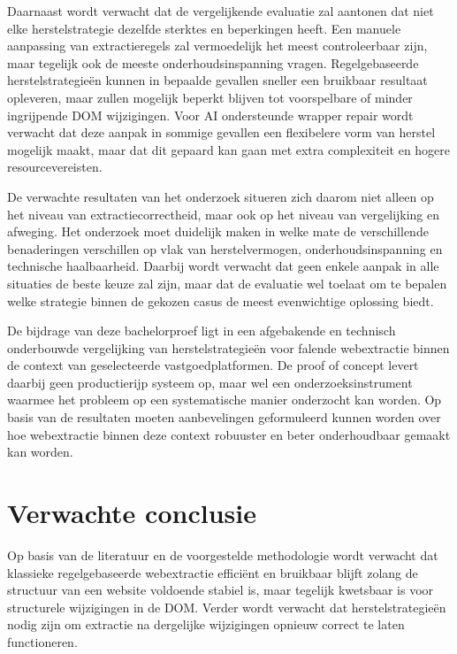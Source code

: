 Daarnaast wordt verwacht dat de vergelijkende evaluatie zal aantonen dat niet elke herstelstrategie dezelfde sterktes en beperkingen heeft. Een manuele aanpassing van extractieregels zal vermoedelijk het meest controleerbaar zijn, maar tegelijk ook de meeste onderhoudsinspanning vragen. Regelgebaseerde herstelstrategieën kunnen in bepaalde gevallen sneller een bruikbaar resultaat opleveren, maar zullen mogelijk beperkt blijven tot voorspelbare of minder ingrijpende DOM wijzigingen. Voor AI ondersteunde wrapper repair wordt verwacht dat deze aanpak in sommige gevallen een flexibelere vorm van herstel mogelijk maakt, maar dat dit gepaard kan gaan met extra complexiteit en hogere resourcevereisten.

De verwachte resultaten van het onderzoek situeren zich daarom niet alleen op het niveau van extractiecorrectheid, maar ook op het niveau van vergelijking en afweging. Het onderzoek moet duidelijk maken in welke mate de verschillende benaderingen verschillen op vlak van herstelvermogen, onderhoudsinspanning en technische haalbaarheid. Daarbij wordt verwacht dat geen enkele aanpak in alle situaties de beste keuze zal zijn, maar dat de evaluatie wel toelaat om te bepalen welke strategie binnen de gekozen casus de meest evenwichtige oplossing biedt.

De bijdrage van deze bachelorproef ligt in een afgebakende en technisch onderbouwde vergelijking van herstelstrategieën voor falende webextractie binnen de context van geselecteerde vastgoedplatformen. De proof of concept levert daarbij geen productierijp systeem op, maar wel een onderzoeksinstrument waarmee het probleem op een systematische manier onderzocht kan worden. Op basis van de resultaten moeten aanbevelingen geformuleerd kunnen worden over hoe webextractie binnen deze context robuuster en beter onderhoudbaar gemaakt kan worden.

\section{Verwachte conclusie}
\label{sec:verwachte-conclusie}

Op basis van de literatuur en de voorgestelde methodologie wordt verwacht dat klassieke regelgebaseerde webextractie efficiënt en bruikbaar blijft zolang de structuur van een website voldoende stabiel is, maar tegelijk kwetsbaar is voor structurele wijzigingen in de DOM. Verder wordt verwacht dat herstelstrategieën nodig zijn om extractie na dergelijke wijzigingen opnieuw correct te laten functioneren.


